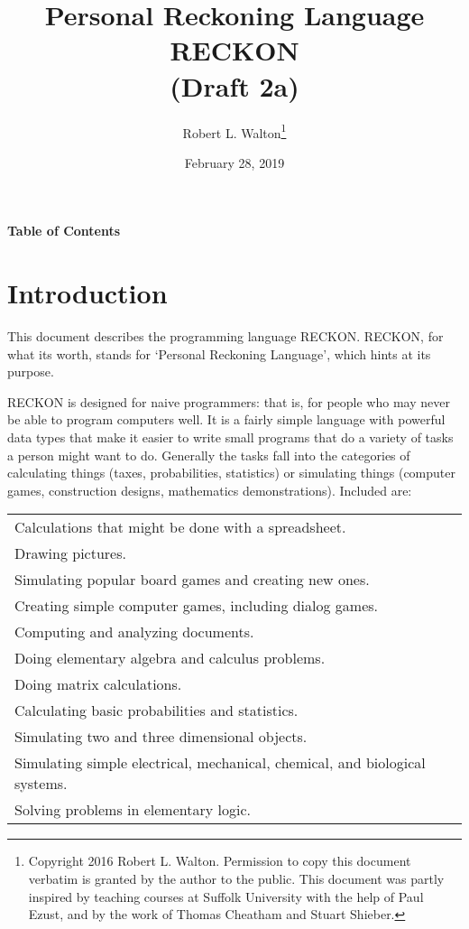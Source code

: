 \documentclass[12pt]{article}
\makeatletter
\renewcommand\tableofcontents{%
    \begin{list}{}%
	     {\setlength{\itemsep}{0in}%
	      \setlength{\topsep}{0in}%
	      \setlength{\parsep}{1ex}%
	      \setlength{\labelwidth}{0in}%
	      \setlength{\baselineskip}{1.5ex}%
	      \setlength{\leftmargin}{0.8in}%
	      \setlength{\rightmargin}{0.8in}}%
    \item\@starttoc{toc}%
    \end{list}}
\makeatother
\begin{document}
        
\title{Personal Reckoning Language\\[2ex]
       RECKON\\[2ex]
       (Draft 2a)}

\author{Robert L. Walton\thanks{Copyright 2016 Robert L. Walton.
Permission to copy this document verbatim is granted by the author
to the public.  This document was partly inspired
by teaching courses at Suffolk University with the help of
Paul Ezust, and by the work of Thomas
Cheatham and Stuart Shieber.}}

\date{February 28, 2019}

\maketitle

\newpage
\begin{center}
\large \bf Table of Contents
\end{center}

\bigskip

\tableofcontents 

\newpage

\section{Introduction}

This document describes the programming language RECKON.  RECKON,
for what its worth, stands for `Personal Reckoning Language',
which hints at its purpose.

RECKON is designed for naive programmers: that is, for people who may never
be able to program computers well.  It is a fairly simple language with
powerful data types that make it easier to write small programs
that do a variety of tasks a person might want to do.  Generally
the tasks fall into the categories of calculating things (taxes,
probabilities, statistics) or simulating things
(computer games, construction designs, mathematics demonstrations).
Included are:

\begin{center}
\begin{tabular}{l}
Calculations that might be done with a spreadsheet. \\
Drawing pictures. \\
Simulating popular board games and creating new ones. \\
Creating simple computer games, including dialog games. \\
Computing and analyzing documents. \\
Doing elementary algebra and calculus problems. \\
Doing matrix calculations. \\ 
Calculating basic probabilities and statistics. \\
Simulating two and three dimensional objects. \\
Simulating simple electrical, mechanical, chemical, and biological systems.\\
Solving problems in elementary logic. \\
\end{tabular}
\end{center}
\end{document}
